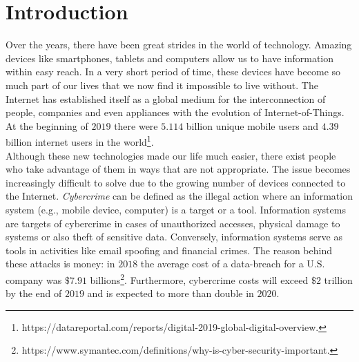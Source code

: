 \documentclass[LaM,binding=0.6cm]{sapthesis}
\begin{document}
\chapter{Introduction}
Over the years, there have been great strides in the world of technology. Amazing devices like smartphones, tablets and computers allow us to have information within easy reach. In a very short period of time, these devices have become so much part of our lives that we now find it impossible to live without. The Internet has established itself as a global medium for the interconnection of people, companies and even appliances with the evolution of Internet-of-Things. At the beginning of $2019$ there were $5.114$ billion unique mobile users and $4.39$ billion internet users in the world\footnote{https://datareportal.com/reports/digital-2019-global-digital-overview.}.\\
Although these new technologies made our life much easier, there exist people who take advantage of them in ways that are not appropriate. The issue becomes increasingly difficult to solve due to the growing number of devices connected to the Internet. \textit{Cybercrime} can be defined as the illegal action where an information system (e.g., mobile device, computer) is a target or a tool\cite{dashora2011cyber}. Information systems are targets of cybercrime in cases of unauthorized accesses, physical damage to systems or also theft of sensitive data. Conversely, information systems serve as tools in activities like email spoofing and financial crimes. The reason behind these attacks is money: in $2018$ the average cost of a data-breach for a U.S. company was $\$7.91$ billions\footnote{https://www.symantec.com/definitions/why-is-cyber-security-important.}. Furthermore, cybercrime costs will exceed $\$2$ trillion by the end of $2019$ and is expected to more than double in $2020$.\\
\end{document}
